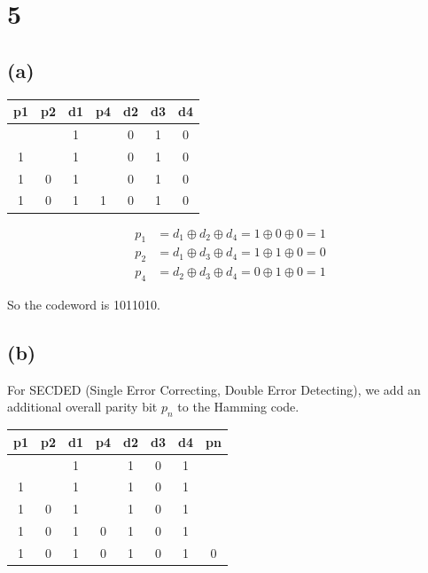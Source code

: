 \documentclass[12pt]{article}
\begin{document}
\section*{5}

\subsection*{(a)}

\begin{table}[htbp]
    \centering
    \begin{tabular}{|c|c|c|c|c|c|c|}
    \hline
    p1 & p2 & d1 & p4 & d2 & d3 & d4 \\
    \hline
       &    & 1  &    & 0  & 1  & 0  \\
    \hline
    1  &    & 1  &    & 0  & 1  & 0  \\
    \hline
    1  & 0  & 1  &    & 0  & 1  & 0  \\
    \hline
    1  & 0  & 1  & 1  & 0 & 1 & 0 \\
    \hline
    \end{tabular}
\end{table}

\begin{align*}
    p_1 &= d_1 \oplus d_2 \oplus d_4 = 1 \oplus 0 \oplus 0 = 1 \\
    p_2 &= d_1 \oplus d_3 \oplus d_4 = 1 \oplus 1 \oplus 0 = 0 \\
    p_4 &= d_2 \oplus d_3 \oplus d_4 = 0 \oplus 1 \oplus 0 = 1
\end{align*}

So the codeword is 1011010.

\subsection*{(b)}

For SECDED (Single Error Correcting, Double Error Detecting), we add an additional overall parity bit $p_n$ to the Hamming code.

\begin{table}[htbp]
    \centering
    \begin{tabular}{|c|c|c|c|c|c|c|c|}
    \hline
    p1 & p2 & d1 & p4 & d2 & d3 & d4 & pn \\
    \hline
       &    & 1  &    & 1  & 0  & 1  &    \\
    \hline
    1  &    & 1  &    & 1  & 0  & 1  &    \\
    \hline
    1  & 0  & 1  &    & 1  & 0  & 1  &    \\
    \hline
    1  & 0  & 1  & 0  & 1  & 0  & 1  &    \\
    \hline
    1  & 0  & 1  & 0  & 1  & 0  & 1  & 0  \\
    \hline
    \end{tabular}
\end{table}
\end{document}
